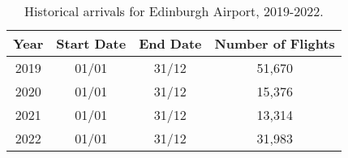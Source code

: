 \begin{table}[ht]
\centering
\begin{tabular}{cccc}
  \hline
{\textbf{Year}} & {\textbf{Start Date}} & {\textbf{End Date}} & {\textbf{Number of Flights}} \\ 
  \hline
2019 & 01/01 & 31/12 & 51,670 \\ 
  2020 & 01/01 & 31/12 & 15,376 \\ 
  2021 & 01/01 & 31/12 & 13,314 \\ 
  2022 & 01/01 & 31/12 & 31,983 \\ 
   \hline
\end{tabular}
\caption{Historical arrivals for Edinburgh Airport, 2019-2022. \label{tab:observed_schedule}} 
\end{table}
